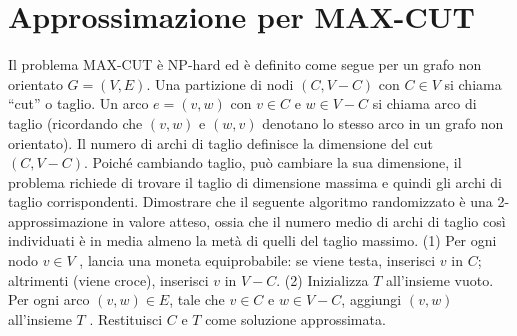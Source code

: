 \chapter{Approssimazione per MAX-CUT}

\begin{problem*}
    Il problema MAX-CUT è NP-hard ed è definito come segue per 
    un grafo non orientato $G = (V, E)$. Una partizione di nodi $(C, V - C)$
    con $C \in V$ si chiama “cut” o taglio. Un arco $e = (v, w)$ con $v \in C$
    e $w \in V - C$ si chiama arco di taglio (ricordando che $(v, w)$ e $(w, v)$
    denotano lo stesso arco in un grafo non orientato). Il numero di archi di 
    taglio definisce la dimensione del cut $(C, V - C)$. Poiché cambiando taglio, 
    può cambiare la sua dimensione, il problema richiede di trovare il taglio di 
    dimensione massima e quindi gli archi di taglio corrispondenti. Dimostrare che 
    il seguente algoritmo randomizzato è una 2-approssimazione in valore atteso, 
    ossia che il numero medio di archi di taglio così individuati è in media almeno
    la metà di quelli del taglio massimo. (1) Per ogni nodo $v \in V$ , lancia una 
    moneta equiprobabile: se viene testa, inserisci $v$ in $C$; altrimenti (viene
    croce), inserisci $v$ in $V - C$. (2) Inizializza $T$ all’insieme vuoto. Per 
    ogni arco $(v, w) \in E$, tale che $v \in C$ e $w \in V - C$, aggiungi $(v, w)$
    all’insieme $T$ . Restituisci $C$ e $T$ come soluzione approssimata.
\end{problem*}
